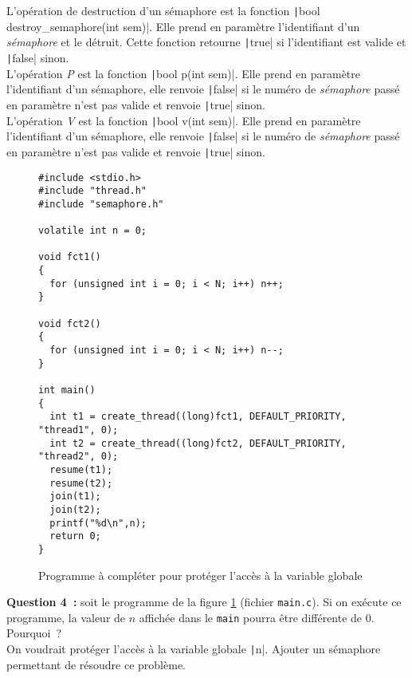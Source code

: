 \documentclass[a4paper]{article}
\begin{document}
L'opération de destruction d'un sémaphore est la fonction 
\texttt|bool destroy_semaphore(int sem)|. Elle prend en paramètre l'identifiant d'un \emph{sémaphore}
et le détruit. Cette fonction retourne \texttt|true| si l'identifiant est valide et \texttt|false| sinon.\\

L'opération \emph{P} est la fonction \texttt|bool p(int sem)|. Elle prend en paramètre l'identifiant d'un 
sémaphore, elle renvoie \texttt|false| si le numéro de \emph{sémaphore} passé en paramètre n'est pas valide et renvoie \texttt|true| sinon.\\

L'opération \emph{V} est la fonction \texttt|bool v(int sem)|. Elle prend en paramètre l'identifiant d'un 
sémaphore, elle renvoie \texttt|false| si le numéro de \emph{sémaphore} passé en paramètre n'est pas valide et renvoie \texttt|true| sinon.\\

\begin{figure}[!htpb]
\begin{verbatim}
#include <stdio.h>
#include "thread.h"
#include "semaphore.h"

volatile int n = 0;

void fct1()
{
  for (unsigned int i = 0; i < N; i++) n++;
}

void fct2()
{
  for (unsigned int i = 0; i < N; i++) n--;
}

int main()
{
  int t1 = create_thread((long)fct1, DEFAULT_PRIORITY, "thread1", 0);
  int t2 = create_thread((long)fct2, DEFAULT_PRIORITY, "thread2", 0);
  resume(t1);
  resume(t2);
  join(t1);
  join(t2);
  printf("%d\n",n);
  return 0;
}
\end{verbatim}
\caption{Programme à compléter pour protéger l'accès à la variable globale}
\label{fig:prog3}
\end{figure}

\textbf{Question 4~:} soit le programme de la figure \ref{fig:prog3} (fichier \verb+main.c+). Si on exécute ce programme, la valeur de $n$ affichée
dans le \verb+main+ pourra être différente de $0$. Pourquoi~?\\
On voudrait protéger l'accès à la variable globale \texttt|n|. Ajouter
un sémaphore permettant de résoudre ce problème.\\
\end{document}
